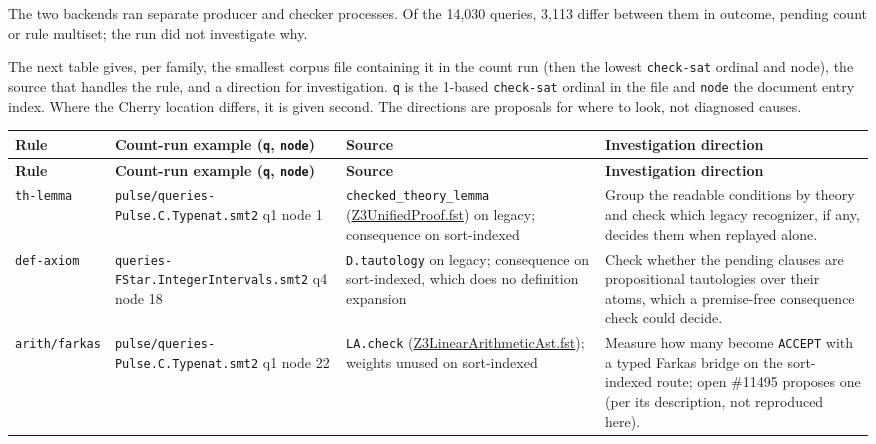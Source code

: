 \documentclass[10pt,a4paper]{article}
\begin{document}
The two backends ran separate producer and checker processes. Of the 14,030 queries, 3,113 differ between them in outcome, pending count or rule multiset; the run did not investigate why.

The next table gives, per family, the smallest corpus file containing it in the count run (then the lowest \texttt{check-{}\allowbreak{}sat} ordinal and node), the source that handles the rule, and a direction for investigation. \texttt{q} is the 1-based \texttt{check-{}\allowbreak{}sat} ordinal in the file and \texttt{node} the document entry index. Where the Cherry location differs, it is given second. The directions are proposals for where to look, not diagnosed causes.

{\footnotesize
\begin{longtable}{>{\raggedright\arraybackslash}p{}>{\raggedright\arraybackslash}p{}>{\raggedright\arraybackslash}p{}>{\raggedright\arraybackslash}p{}}
\toprule
\textbf{Rule} & \textbf{Count-run example (\texttt{q}, \texttt{node})} & \textbf{Source} & \textbf{Investigation direction} \\
\midrule
\endfirsthead
\toprule
\textbf{Rule} & \textbf{Count-run example (\texttt{q}, \texttt{node})} & \textbf{Source} & \textbf{Investigation direction} \\
\midrule
\endhead
\bottomrule
\endlastfoot
\texttt{th-{}\allowbreak{}lemma} & \texttt{pulse/\allowbreak{}queries-{}\allowbreak{}Pulse.\allowbreak{}C.\allowbreak{}Typenat.\allowbreak{}smt2} q1 node 1 & \texttt{checked\_\allowbreak{}theory\_\allowbreak{}lemma} (\href{https://github.com/Z3Prover/z3/blob/8fbb275aba0472e862e289c7af1331b3bd5d512c/fstar/Z3UnifiedProof.fst\#L1069-L1082}{Z3Unified\allowbreak{}Proof.\allowbreak{}fst}) on legacy; consequence on sort-indexed & Group the readable conditions by theory and check which legacy recognizer, if any, decides them when replayed alone. \\
\texttt{def-{}\allowbreak{}axiom} & \texttt{queries-{}\allowbreak{}FStar.\allowbreak{}IntegerIntervals\allowbreak{}.\allowbreak{}smt2} q4 node 18 & \texttt{D.\allowbreak{}tautology} on legacy; consequence on sort-indexed, which does no definition expansion & Check whether the pending clauses are propositional tautologies over their atoms, which a premise-free consequence check could decide. \\
\texttt{arith/\allowbreak{}farkas} & \texttt{pulse/\allowbreak{}queries-{}\allowbreak{}Pulse.\allowbreak{}C.\allowbreak{}Typenat.\allowbreak{}smt2} q1 node 22 & \texttt{LA.\allowbreak{}check} (\href{https://github.com/Z3Prover/z3/blob/8fbb275aba0472e862e289c7af1331b3bd5d512c/fstar/Z3LinearArithmeticAst.fst\#L176-L180}{Z3Linear\allowbreak{}Arithmetic\allowbreak{}Ast.\allowbreak{}fst}); weights unused on sort-indexed & Measure how many become \texttt{ACCEPT} with a typed Farkas bridge on the sort-indexed route; open \#11495 proposes one (per its description, not reproduced here). \\

\end{longtable}}
\end{document}
